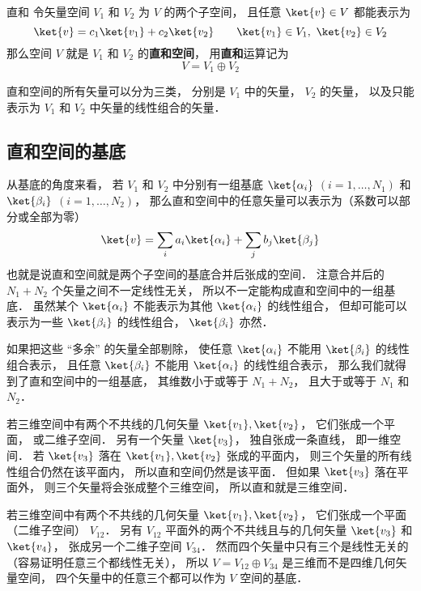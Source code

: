 
\begin{definition}{直和}
令矢量空间 $V_1$ 和 $V_2$ 为 $V$ 的两个子空间， 且任意 $\ket{v} \in V$ 都能表示为
\begin{equation}
\ket{v} = c_1 \ket{v_1} + c_2 \ket{v_2}
\qquad
\ket{v_1} \in V_1,\ \ket{v_2} \in V_2
\end{equation}
那么空间 $V$ 就是 $V_1$ 和 $V_2$ 的\textbf{直和空间}， 用\textbf{直和}运算记为
\begin{equation}
V = V_1 \oplus V_2
\end{equation}
\end{definition}

直和空间的所有矢量可以分为三类， 分别是 $V_1$ 中的矢量， $V_2$ 的矢量， 以及只能表示为 $V_1$ 和 $V_2$ 中矢量的线性组合的矢量．

\subsection{直和空间的基底}
从基底的角度来看， 若 $V_1$ 和 $V_2$ 中分别有一组基底 $\ket{\alpha_i}$ $(i = 1, \dots, N_1)$ 和 $\ket{\beta_i}$ $(i = 1, \dots, N_2)$， 那么直和空间中的任意矢量可以表示为（系数可以部分或全部为零）
\begin{equation}
\ket{v} = \sum_i a_i \ket{\alpha_i} + \sum_j b_j \ket{\beta_j}
\end{equation}
也就是说直和空间就是两个子空间的基底合并后张成的空间． 注意合并后的 $N_1 + N_2$ 个矢量之间不一定线性无关， 所以不一定能构成直和空间中的一组基底． 虽然某个 $\ket{\alpha_i}$ 不能表示为其他 $\ket{\alpha_i}$ 的线性组合， 但却可能可以表示为一些 $\ket{\beta_i}$ 的线性组合， $\ket{\beta_i}$ 亦然．

如果把这些 “多余” 的矢量全部剔除， 使任意 $\ket{\alpha_i}$ 不能用 $\ket{\beta_i}$ 的线性组合表示， 且任意 $\ket{\beta_i}$ 不能用 $\ket{\alpha_i}$ 的线性组合表示， 那么我们就得到了直和空间中的一组基底， 其维数小于或等于 $N_1 + N_2$， 且大于或等于 $N_1$ 和 $N_2$．

\begin{example}{}\label{DirSum_ex1}
若三维空间中有两个不共线的几何矢量 $\ket{v_1}, \ket{v_2}$， 它们张成一个平面， 或二维子空间． 另有一个矢量 $\ket{v_3}$， 独自张成一条直线， 即一维空间． 若 $\ket{v_3}$ 落在 $\ket{v_1}, \ket{v_2}$ 张成的平面内， 则三个矢量的所有线性组合仍然在该平面内， 所以直和空间仍然是该平面． 但如果 $\ket{v_3}$ 落在平面外， 则三个矢量将会张成整个三维空间， 所以直和就是三维空间．
\end{example}

\begin{example}{}\label{DirSum_ex2}
若三维空间中有两个不共线的几何矢量 $\ket{v_1}, \ket{v_2}$， 它们张成一个平面（二维子空间） $V_{12}$． 另有 $V_{12}$ 平面外的两个不共线且与的几何矢量 $\ket{v_3}$ 和 $\ket{v_4}$， 张成另一个二维子空间 $V_{34}$． 然而四个矢量中只有三个是线性无关的（容易证明任意三个都线性无关）， 所以 $V = V_{12} \oplus V_{34}$ 是三维而不是四维几何矢量空间， 四个矢量中的任意三个都可以作为 $V$ 空间的基底．
\end{example}
